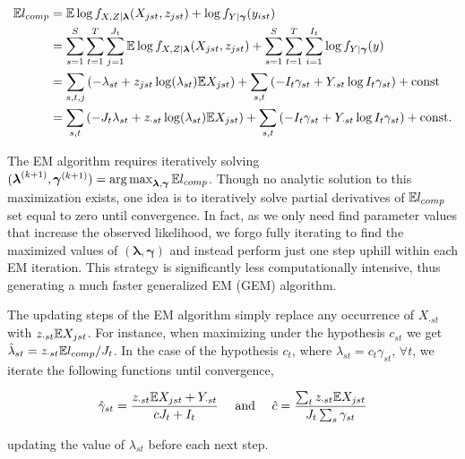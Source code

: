 \begin{align*}
  \mathbb{E} l_{comp} 
  & = \mathbb{E} \log{f_{X,Z|\boldsymbol{\lambda}}(X_{jst},z_{jst})} + \log{f_{Y|\boldsymbol{\gamma}}(y_{ist})} \\
  & = \sum_{s=1}^S \sum_{t=1}^T \sum_{j=1}^{J_t} \mathbb{E} \log{f_{X,Z|\boldsymbol{\lambda}}(X_{jst},z_{jst})}
  + \sum_{s=1}^S \sum_{t=1}^T \sum_{i=1}^{I_t} \log{f_{Y|\boldsymbol{\gamma}}(y)} \\
  & = \sum_{s,t,j} \left( - \lambda_{st} 
    + z_{jst} \log(\lambda_{st}) \mathbb{E} X_{jst} \right) + \sum_{s,t} \left( -I_t \gamma_{st} + Y_{\cdot st} \log{I_t \gamma_{st}} \right) + \text{const} \\
  & = \sum_{s,t} \left( -J_t \lambda_{st} + z_{\cdot st} \log(\lambda_{st}) \mathbb{E} X_{jst} \right) + \sum_{s,t} \left( -I_t \gamma_{st} + Y_{\cdot st} \log{I_t \gamma_{st}} \right) + \text{const}.
\end{align*}

The EM algorithm requires iteratively solving $(\boldsymbol{\lambda}^{(k+1)},\boldsymbol{\gamma}^{(k+1)}) = \operatorname*{arg\,max}_{\boldsymbol{\lambda},\boldsymbol{\gamma}} \mathbb{E} l_{comp}$.  Though no analytic solution to this maximization exists, one idea is to iteratively solve partial derivatives of $\mathbb{E} l_{comp}$ set equal to zero until convergence.  In fact, as we only need find parameter values that increase the observed likelihood, we forgo fully iterating to find the maximized values of $(\boldsymbol{\lambda}, \boldsymbol{\gamma})$ and instead perform just one step uphill within each EM iteration.  This strategy is significantly less computationally intensive, thus generating a much faster generalized EM (GEM) algorithm.  

The updating steps of the EM algorithm simply replace any occurrence of $X_{\cdot st}$ with $z_{\cdot st}\mathbb{E} X_{jst}$.  For instance, when maximizing under the hypothesis $c_{st}$ we get $\hat{\lambda}_{st} = z_{\cdot st} \mathbb{E} l_{comp} / J_t$.  In the case of the hypothesis $c_t$, where $\lambda_{st} = c_t \gamma_{st}, \, \forall t$, we iterate the following functions until convergence, 

\begin{equation*}
  \hat{\gamma}_{st} = \frac{z_{\cdot st} \mathbb{E} X_{jst} + Y_{\cdot st}}{cJ_t + I_t} \quad \text{ and } \quad \hat{c} = \frac{ \sum_{t} z_{\cdot st} \mathbb{E} X_{jst}}{ J_t \sum_{s} \gamma_{st}}
\end{equation*}

\noindent updating the value of $\lambda_{st}$ before each next step. 


